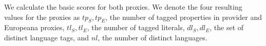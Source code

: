



\noindent We calculate the basic scores for both proxies. %
We denote the four resulting values for the proxies as $tp_S, tp_E$, the number of tagged properties in provider and Europeana proxies, $tl_S, tl_E$, the number of tagged literals, $dl_S, dl_E$, the set of distinct language tags, and $nl$, the number of distinct languages. 



